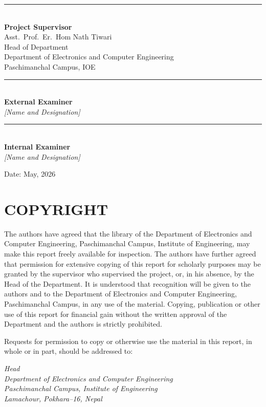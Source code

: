 \documentclass[12pt,a4paper,oneside]{report}
\begin{document}
\vspace{2cm}
\noindent\rule{6cm}{0.5pt}\\
\textbf{Project Supervisor}\\
Asst.\ Prof.\ Er.\ Hom Nath Tiwari\\
Head of Department\\
Department of Electronics and Computer Engineering\\
Paschimanchal Campus, IOE

\vspace{1.5cm}
\noindent\rule{6cm}{0.5pt}\\
\textbf{External Examiner}\\
\textit{[Name and Designation]}

\vspace{1.5cm}
\noindent\rule{6cm}{0.5pt}\\
\textbf{Internal Examiner}\\
\textit{[Name and Designation]}

\vspace{1cm}
\noindent Date: May, 2026

\chapter*{COPYRIGHT}

The authors have agreed that the library of the Department of Electronics
and Computer Engineering, Paschimanchal Campus, Institute of Engineering,
may make this report freely available for inspection. The authors have
further agreed that permission for extensive copying of this report for
scholarly purposes may be granted by the supervisor who supervised the
project, or, in his absence, by the Head of the Department. It is
understood that recognition will be given to the authors and to the
Department of Electronics and Computer Engineering, Paschimanchal Campus,
in any use of the material. Copying, publication or other use of this
report for financial gain without the written approval of the Department
and the authors is strictly prohibited.

Requests for permission to copy or otherwise use the material in this
report, in whole or in part, should be addressed to:

\vspace{1cm}
\noindent\hspace{1cm}\textit{Head}\\
\noindent\hspace{1cm}\textit{Department of Electronics and Computer
Engineering}\\
\noindent\hspace{1cm}\textit{Paschimanchal Campus, Institute of Engineering}\\
\noindent\hspace{1cm}\textit{Lamachour, Pokhara--16, Nepal}
\end{document}
